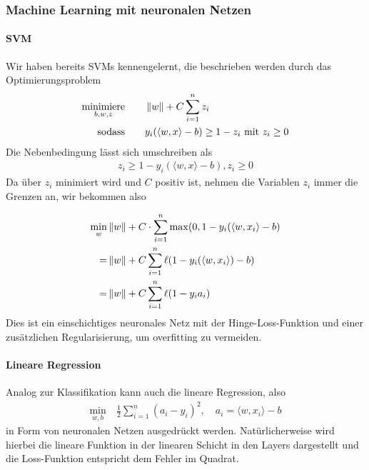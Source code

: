 \subsubsection{Machine Learning mit neuronalen Netzen}
\label{sec:MLNN}

\paragraph{SVM} Wir haben bereits SVMs kennengelernt, die beschrieben werden durch das Optimierungsproblem
\begin{align*}
\underset{b,w,z}{\text{minimiere}} &\qquad\left\lVert w\right\rVert + C  \sum_{i=1}^{n} z_i\\
\text{sodass} &\qquad y_i (\langle w,x \rangle - b) \geq 1 - z_i \text { mit } z_i \geq 0
\end{align*}
Die Nebenbedingung lässt sich umschreiben als
\begin{align*}
z_i \geq 1- y_i (\langle w,x \rangle - b), z_i \geq 0
\end{align*}
Da über $z_i$ minimiert wird und $C$ positiv ist, nehmen die Variablen $z_i$ immer die Grenzen an, wir bekommen also

\begin{align*}
\min_w &\left\lVert w\right\rVert + C \cdot \sum_{i=1}^{n} \max (0, 1-y_i (\langle w,x_i\rangle-b) \\
 = &\left\lVert w\right\rVert + C \sum_{i=1}^{n} \ell ( 1-y_i (\langle w,x_i\rangle)-b) \\
=&\left\lVert w\right\rVert + C \sum_{i=1}^{n} \ell (1 - y_i a_i)
\end{align*}
Dies ist ein einschichtiges neuronales Netz mit der Hinge-Loss-Funktion und einer zus\"atzlichen Regularisierung, um overfitting zu vermeiden. \\
%
\paragraph{Lineare Regression} Analog zur Klassifikation kann auch die lineare Regression, also
\begin{align*}
\min\limits_{w,b} \ & \frac{1} {2} \sum_{i=1}^{n} (a_i -y_i)^2, \quad a_i = \langle w,x_i\rangle -b
\end{align*}
in Form von neuronalen Netzen ausgedrückt werden. Nat\"urlicherweise wird hierbei die lineare Funktion in der linearen Schicht in den Layers dargestellt und die Loss-Funktion entspricht dem Fehler im Quadrat.





